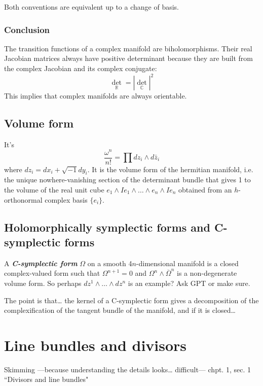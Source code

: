Both conventions are equivalent up to a change of basis.

\subsubsection*{Conclusion}

The transition functions of a complex manifold are biholomorphisms. Their real Jacobian matrices always have positive determinant because they are built from the complex Jacobian and its complex conjugate:
\[
\det_{\mathbb{R}} = |\det_{\mathbb{C}}|^2
\]
This implies that complex manifolds are always orientable.

\subsection{Volume form}
It's
\[\frac{\omega^n}{n!}=\prod dz_i \wedge d\bar{z}_i\]
where \(dz_i=dx_i + \sqrt{-1}dy_i\). It is the volume form of the hermitian manifold, i.e. the unique nowhere-vanishing section of the determinant bundle that gives 1 to the volume of the real unit cube \(e_1 \wedge Ie_1\wedge\ldots\wedge e_n \wedge I e_n\) obtained from an \(h\)-orthonormal complex basis \(\{e_i\}\).

\subsection{Holomorphically symplectic forms and C-symplectic forms}

A \textit{\textbf{C-symplectic form}} \(\Omega\) on a smooth 4\(n\)-dimensional manifold is a closed complex-valued form such that \(\Omega^{n+1}=0\) and \(\Omega^n \wedge \overline{ \Omega}^n\) is a non-degenerate volume form. So perhaps \(dz^1 \wedge \ldots \wedge dz^n\) is an example? Ask GPT or make sure.

The point is that… the kernel of a C-symplectic form gives a decomposition of the complexification of the tangent bundle of the manifold, and if it is closed…

\section{Line bundles and divisors}

Skimming ---because understanding the details looks… difficult--- \cite{gri} chpt. 1, sec. 1 ``Divisors and line bundles"

